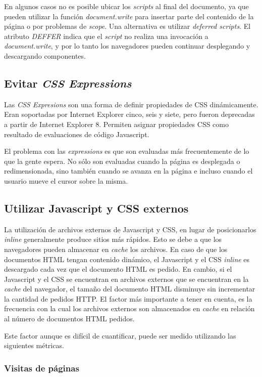 En algunos casos no es posible ubicar los \emph{scripts} al final del documento, ya que pueden utilizar
la función \emph{document.write} para insertar parte del contenido de la página o por problemas de
\emph{scope}. Una alternativa es utilizar \emph{deferred scripts}. El atributo \emph{DEFFER} indica que
el \emph{script} no realiza una invocación a \emph{document.write}, y por lo tanto los navegadores pueden continuar desplegando y descargando componentes.


\subsection{Evitar \emph{CSS Expressions}}

Las \emph{CSS Expresions} son una forma de definir propiedades de CSS dinámicamente. Eran soportadas por Internet Explorer cinco, seis y siete, pero fueron deprecadas a
partir de Internet Explorer 8. Permiten asignar propiedades CSS como resultado de evaluaciones de código Javascript.

El problema con las \emph{expressions} es que son evaluadas más frecuentemente de lo que la gente espera. No sólo son evaluadas cuando la página es desplegada o
redimensionada, sino también cuando se avanza en la página e incluso cuando el usuario mueve el cursor sobre la misma.

\subsection{Utilizar Javascript y CSS externos}

La utilización de archivos externos de Javascript y CSS, en lugar de posicionarlos \emph{inline} generalmente produce sitios más rápidos. Esto se debe a que los navegadores
pueden almacenar en \emph{cache} los archivos. En caso de que los documentos HTML tengan contenido dinámico, el Javascript y el CSS \emph{inline} es descargado
cada vez que el documento HTML es pedido. En cambio, si el Javascript y el CSS se encuentran en archivos externos que se encuentran en la \emph{cache} del navegador,
el tamaño del documento HTML disminuye sin incrementar la cantidad de pedidos HTTP. El factor más importante a tener en cuenta, es la frecuencia con la cual los
archivos externos son almacenados en \emph{cache} en relación al número de documentos HTML pedidos.

Este factor aunque es difícil de cuantificar, puede ser medido utilizando las siguientes métricas.

\subsubsection{Visitas de páginas}

